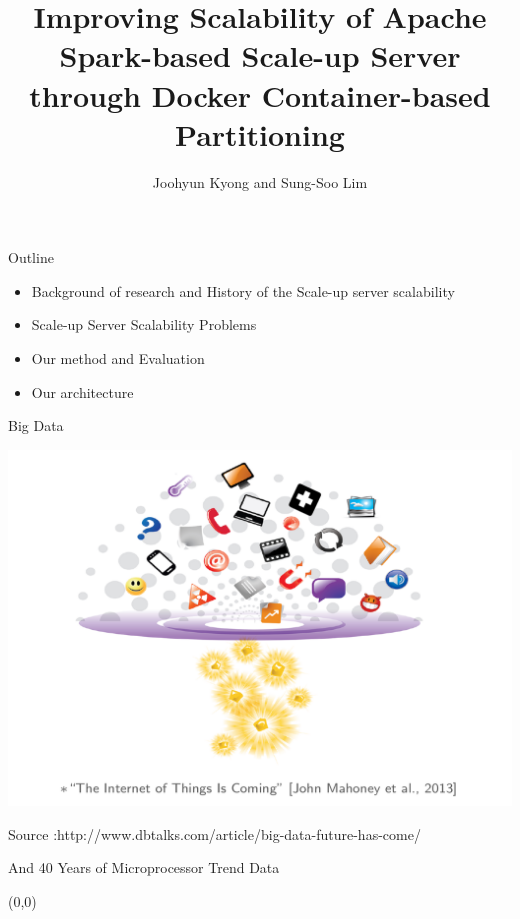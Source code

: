 \documentclass[english]{beamer} %
\begin{document}
\title[Memory Scalability]{
Improving Scalability of Apache Spark-based Scale-up Server
through Docker Container-based Partitioning
}

\author{Joohyun Kyong and Sung-Soo Lim}


\begin{frame}
  \titlepage
\end{frame}

\begin{frame}{Outline}
	\begin{itemize}
	\item Background of research and History of the Scale-up server scalability 
	\item Scale-up Server Scalability Problems
	\item Our method and Evaluation
	\item Our architecture
	\end{itemize}
\end{frame}


\begin{frame}{Big Data}
\begin{center}
\includegraphics[scale=0.7]{fig/bigdata}
\end{center}
\tiny{Source :http://www.dbtalks.com/article/big-data-future-has-come/}
\end{frame}

\begin{frame}{And 40 Years of Microprocessor Trend Data}
\begin{textblock}{1}(0,0)
\end{textblock}
\end{frame}
\end{document}
